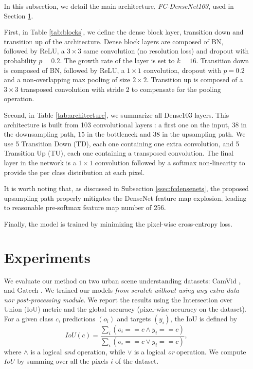 \documentclass[10pt,twocolumn,letterpaper]{article}
\begin{document}
In this subsection, we detail the main architecture, \textit{FC-DenseNet103}, used in Section \ref{sec:experiments}. 

First, in Table \ref{tab:blocks}, we define the dense block layer, transition down and transition up of the architecture. Dense block layers are composed of BN, followed by ReLU, a $3 \times 3$ same convolution (no resolution loss) and dropout with probability $p=0.2$. The growth rate of the layer is set to $k=16$. Transition down is composed of BN, followed by ReLU, a $1 \times 1$ convolution, dropout with $p=0.2$ and a non-overlapping max pooling of size $2 \times 2$. Transition up is composed of a $3 \times 3$ transposed convolution with stride 2 to compensate for the pooling operation.

Second, in Table \ref{tab:architecture}, we summarize all Dense103 layers. This architecture is built from 103 convolutional layers : a first one on the input, 38 in the downsampling path, 15 in the bottleneck and 38 in the upsampling path. We use 5 Transition Down (TD), each one containing one extra convolution, and 5 Transition Up (TU), each one containing a transposed convolution. The final layer in the network is a $1\times1$ convolution followed by a softmax non-linearity to provide the per class distribution at each pixel. 

It is worth noting that, as discussed in Subsection \ref{ssec:fcdensenets}, the proposed upsampling path properly mitigates the DenseNet feature map explosion, leading to reasonable pre-softmax feature map number of 256.

Finally, the model is trained by minimizing the pixel-wise cross-entropy loss.

\section{Experiments}
\label{sec:experiments} 
We evaluate our method on two urban scene understanding datasets: CamVid \cite{camvid}, and Gatech \cite{Gatech}. We trained our models \emph{from scratch without using any extra-data nor post-processing module}. We report the results using the Intersection over Union (IoU) metric and the global accuracy (pixel-wise accuracy on the dataset). For a given class $c$, predictions $(o_i)$ and targets $(y_i)$, the IoU is defined by 
\begin{equation}
IoU(c) = \frac{\sum_i{(o_i==c \land y_i==c)}}{\sum_i{(o_i==c \lor y_i==c)}},
\end{equation}
where $\land$ is a logical \textit{and} operation, while $\lor$ is a logical \textit{or} operation. We compute $IoU$ by summing over all the pixels $i$ of the dataset.
\end{document}
